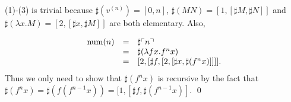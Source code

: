 \begin{pf} \rm
 (1)-(3) is trivial because $\sharp(v^{(n)})=[0,n]$,
 $\sharp(MN)=[1,[\sharp M, \sharp N]]$ and
 $\sharp(\lambda x.M) = [2, [\sharp x, \sharp M]]$ are both elementary. Also, 

 \[
  \begin{array}{rcl}
    \mathrm{num}(n) & = & \sharp\ulcorner{n}\urcorner \\
    & = & \sharp( \lambda fx. f^n x )  \\
    & = & 
      [2,
	[
	  \sharp f,
	  [
	    2, [
	      \sharp x, \sharp(f^n x)
	    ]]
	]
      ].
  \end{array}
 \]
 Thus we only need to show that $\sharp(f^n x)$ is recursive by the fact that
 $\sharp(f^nx) = \sharp(f(f^{n-1}x))=[1,[\sharp f, \sharp(f^{n-1}x)]$.
 \qed
\end{pf}
